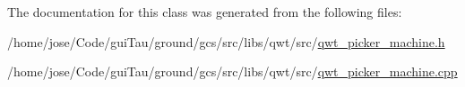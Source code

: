 The documentation for this class was generated from the following files\-:\begin{DoxyCompactItemize}
\item 
/home/jose/\-Code/gui\-Tau/ground/gcs/src/libs/qwt/src/\hyperlink{qwt__picker__machine_8h}{qwt\-\_\-picker\-\_\-machine.\-h}\item 
/home/jose/\-Code/gui\-Tau/ground/gcs/src/libs/qwt/src/\hyperlink{qwt__picker__machine_8cpp}{qwt\-\_\-picker\-\_\-machine.\-cpp}\end{DoxyCompactItemize}
